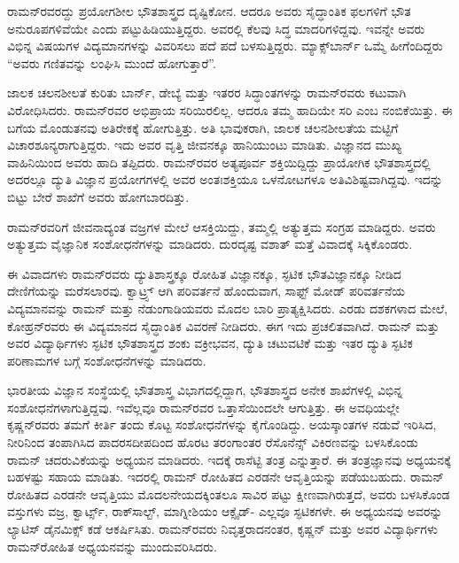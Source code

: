 ರಾಮನ್‍ರವರದ್ದು ಪ್ರಯೋಗಶೀಲ ಭೌತಶಾಸ್ತ್ರದ ದೃಷ್ಟಿಕೋನ. ಆದರೂ ಅವರು ಸೈದ್ಧಾಂತಿಕ ಫಲಗಳಿಗೆ ಭೌತ ಅನುರೂಪಗಳಿವೆಯೇ ಎಂದು ಪಟ್ಟುಹಿಡಿಯುತ್ತಿದ್ದರು. ಅವರಲ್ಲಿ ಕೆಲವು ಸಿದ್ಧ ಮಾದರಿಗಳಿದ್ದವು. ಇವನ್ನೇ ಅವರು ವಿಭಿನ್ನ ವಿಷಯಗಳ ವಿದ್ಯಮಾನಗಳನ್ನು ವಿವರಿಸಲು ಪದೆ ಪದೆ ಬಳಸುತ್ತಿದ್ದರು. ಮ್ಯಾಕ್ಸ್‌ಬಾರ್ನ್ ಒಮ್ಮೆ ಹೀಗೆಂದಿದ್ದರು “ಅವರು ಗಣಿತವನ್ನು ಲಂಘಿಸಿ ಮುಂದೆ ಹೋಗುತ್ತಾರೆ”.

ಜಾಲಕ ಚಲನಶೀಲತೆ ಕುರಿತು ಬಾರ್ನ್, ಡೇಬ್ಯೆ ಮತ್ತು ಇತರರ ಸಿದ್ಧಾಂತಗಳನ್ನು ರಾಮನ್‍ರವರು ಕಟುವಾಗಿ ವಿರೋಧಿಸಿದರು. ರಾಮನ್‍ರವರ ಅಭಿಪ್ರಾಯ ಸರಿಯಿರಲಿಲ್ಲ. ಆದರೂ ತಮ್ಮ ಹಾದಿಯೇ ಸರಿ ಎಂಬ ನಂಬಿಕೆಯಿತ್ತು. ಈ ಬಗೆಯ ಮೊಂಡುತನವು ಅತಿರೇಕಕ್ಕೆ ಹೋಗುತ್ತಿತ್ತು. ಅತಿ ಭಾವುಕರಾಗಿ, ಜಾಲಕ ಚಲನಶೀಲತೆಯ ಮಟ್ಟಿಗೆ ವಿಚಾರಶೂನ್ಯರಾಗುತ್ತಿದ್ದರು. ಇದು ಅವರ ವೃತ್ತಿ ಜೀವನಕ್ಕೂ ಹಾನಿಯುಂಟು ಮಾಡಿತು. ವಿಜ್ಞಾನದ ಮುಖ್ಯ ವಾಹಿನಿಯಿಂದ ಅವರು ಹಾದಿ ತಪ್ಪಿದರು. ರಾಮನ್‍ರವರ ಅತ್ಯಪೂರ್ವ ಶಕ್ತಿಯಿದ್ದಿದ್ದು ಪ್ರಾಯೋಗಿಕ ಭೌತಶಾಸ್ತ್ರದಲ್ಲಿ ಅದರಲ್ಲೂ ದ್ಯುತಿ ವಿಜ್ಞಾನ ಪ್ರಯೋಗಗಳಲ್ಲಿ ಅವರ ಅಂತಃಶಕ್ತಿಯೂ ಒಳನೋಟಗಳೂ ಅತಿವಿಶಿಷ್ಟವಾಗಿದ್ದವು. ಇದನ್ನು ಬಿಟ್ಟು ಬೇರೆ ಶಾಖೆಗೆ ಅವರು ಹೋಗಬಾರದಿತ್ತು.

ರಾಮನ್‍ರವರಿಗೆ ಜೀವನಾದ್ಯಂತ ವಜ್ರಗಳ ಮೇಲೆ ಆಸಕ್ತಿಯಿದ್ದು, ತಮ್ಮಲ್ಲಿ ಅತ್ಯುತ್ತಮ ಸಂಗ್ರಹ ಮಾಡಿದ್ದರು. ಅವರು ಅತ್ಯುತ್ತಮ ವೈಜ್ಞಾನಿಕ ಸಂಶೋಧನೆಗಳನ್ನು ಮಾಡಿದರು. ದುರದೃಷ್ಟ ವಶಾತ್ ಮತ್ತೆ ವಿವಾದಕ್ಕೆ ಸಿಕ್ಕಿಕೊಂಡರು.

ಈ ವಿವಾದಗಳು ರಾಮನ್‍ರವರು ದ್ಯುತಿಶಾಸ್ತ್ರಕ್ಕೂ ರೋಹಿತ ವಿಜ್ಞಾನಕ್ಕೂ, ಸ್ಫಟಿಕ ಭೌತವಿಜ್ಞಾನಕ್ಕೂ ನೀಡಿದ ದೇಣಿಗೆಯನ್ನು ಮರೆಸಲಾರವು. ಕ್ವಾಟ್ರ್ಸ್ ಆಗಿ ಪರಿವರ್ತನೆ ಹೊಂದುವಾಗ, ಸಾಫ್ಟ್ ಮೋಡ್ ಪರಿವರ್ತನೆಯ ವಿದ್ಯಮಾನವನ್ನು ರಾಮನ್ ಮತ್ತು ನೆಡುಂಗಾಡಿಯವರು ಮೊದಲ ಬಾರಿ ಪ್ರಾತ್ಯಕ್ಷಿಸಿದರು. ಎರಡು ದಶಕಗಳಾದ ಮೇಲೆ, ಕೋಹ್ರನ್‍ರವರು ಈ ವಿದ್ಯಮಾನದ ಸೈದ್ಧಾಂತಿಕ ವಿವರಣೆ ನೀಡಿದರು. ಈಗ ಇದು ಪ್ರಚಲಿತವಾಗಿದೆ. ರಾಮನ್ ಮತ್ತು ಅವರ ವಿದ್ಯಾರ್ಥಿಗಳು ಸ್ಫಟಿಕ ಭೌತಶಾಸ್ತ್ರದ ಶಂಕು ವಕ್ರೀಭವನ, ದ್ಯುತಿ ಚಟುವಟಿಕೆ ಮತ್ತು ಇತರ ದ್ಯುತಿ ಸ್ಫಟಿಕ ಪರಿಣಾಮಗಳ ಬಗ್ಗೆ ಸಂಶೋಧನೆಗಳನ್ನು ಮಾಡಿದರು.

ಭಾರತೀಯ ವಿಜ್ಞಾನ ಸಂಸ್ಥೆಯಲ್ಲಿ ಭೌತಶಾಸ್ತ್ರ ವಿಭಾಗದಲ್ಲಿದ್ದಾಗ, ಭೌತಶಾಸ್ತ್ರದ ಅನೇಕ ಶಾಖೆಗಳಲ್ಲಿ ವಿಭಿನ್ನ ಸಂಶೋಧನೆಗಳಾಗುತ್ತಿದ್ದವು. ಇವೆಲ್ಲವೂ ರಾಮನ್‍ರವರ ಒತ್ತಾಸೆಯಿಂದಲೇ ಆಗುತ್ತಿತ್ತು. ಈ ಅವಧಿಯಲ್ಲೇ ಕೃಷ್ಣನ್‍ರವರು ತಮಗೆ ಕೀರ್ತಿ ತಂದು ಕೊಟ್ಟ ಸಂಶೋಧನೆಗಳನ್ನು ಕೈಗೊಂಡಿದ್ದು. ಅಯಸ್ಕಾಂತಗಳ ನಡುವೆ ಇರಿಸಿದ, ನೀರಿನಿಂದ ತಂಪಾಗಿಸಿದ ಪಾದರಸದೀಪದಿಂದ ಹೊರಟ ತರಂಗಾಂತರ  ರೆಸೊನೆನ್ಸ್ ವಿಕಿರಣವನ್ನು ಬಳಸಿಕೊಂಡು ರಾಮನ್ ಚದರುವಿಕೆಯನ್ನು ಅಧ್ಯಯನ ಮಾಡಿದರು. ಇದಕ್ಕೆ ರಾಸೆಟ್ಟಿ ತಂತ್ರ ಎನ್ನುತ್ತಾರೆ. ಈ ತಂತ್ರಜ್ಞಾನವು ಅಧ್ಯಯನಕ್ಕೆ ಬಹಳಷ್ಟು ಸಹಾಯ ಮಾಡಿತು. ಇದರಲ್ಲಿ ರಾಮನ್ ರೋಹಿತದ  ಎರಡನೇ ಆವೃತ್ತಿಯನ್ನು ಪಡೆಯಬಹುದು. ರಾಮನ್ ರೋಹಿತದ  ಎರಡನೇ ಆವೃತ್ತಿಯು ಮೊದಲನೇಯದಕ್ಕಿಂತಲೂ ಸಾವಿರ ಪಟ್ಟು ಕ್ಷೀಣವಾಗಿರುತ್ತದೆ, ಅವರು ಬಳಸಿಕೊಂಡ ವಸ್ತುಗಳು ವಜ್ರ, ಕ್ವಾರ್ಟ್ಸ್, ರಾಕ್‍ಸಾಲ್ಟ್, ಮಾಗ್ನೀಶಿಯಂ ಆಕ್ಸೈಡ್- ಎಲ್ಲವೂ ಸ್ಫಟಿಕಗಳೇ. ಈ ಅಧ್ಯಯನವು ಅವರನ್ನು ಲ್ಯಾಟಿಸ್ ಡೈನಮಿಕ್ಸ್ ಕಡೆ ಆಕರ್ಷಿಸಿತು. ರಾಮನ್‍ರವರು ನಿವೃತ್ತರಾದನಂತರ, ಕೃಷ್ಣನ್ ಮತ್ತು ಅವರ ವಿದ್ಯಾರ್ಥಿಗಳು ರಾಮನ್‍ರೋಹಿತ ಅಧ್ಯಯನವನ್ನು ಮುಂದುವರಿಸಿದರು.

